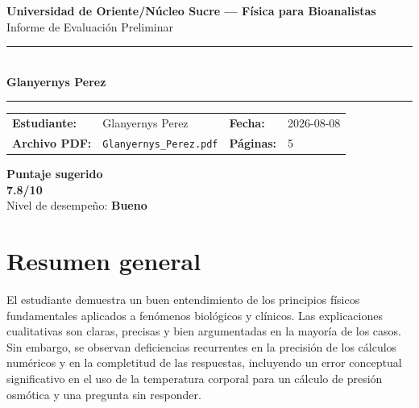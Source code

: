 \documentclass[11pt,a4paper]{article}
\begin{document}
\begin{center}
  {\Large\bfseries\color{azulTitulo} Universidad de Oriente/Núcleo Sucre --- Física para Bioanalistas}\\[4pt]
  {\large Informe de Evaluación Preliminar}\\[12pt]
  \rule{\linewidth}{1.2pt}\\[6pt]
  {\LARGE\bfseries Glanyernys Perez}\\[4pt]
  \rule{\linewidth}{0.6pt}
\end{center}

\vspace{4pt}
\begin{tcolorbox}[cajaTitulo, title=Datos del informe]
\begin{tabular}{@{}llll@{}}
  \textbf{Estudiante:}  & Glanyernys Perez  &
  \textbf{Fecha:}       & 2026-08-08 \\[4pt]
  \textbf{Archivo PDF:} & \texttt{Glanyernys\_Perez.pdf}  &
  \textbf{Páginas:}     & 5 \\
\end{tabular}
\end{tcolorbox}

\vspace{6pt}
\begin{center}
  \begin{tcolorbox}[
    enhanced,
    colback=white, colframe=desempeno_bueno,
    width=0.62\linewidth,
    boxrule=2pt,
    halign=center, valign=center,
    top=8pt, bottom=8pt,
  ]
    \centering
    {\large\bfseries Puntaje sugerido}\\[6pt]
    {\Huge\bfseries\color{desempeno_bueno} 7.8/10}\\[6pt]
    {\large Nivel de desempeño: \textbf{\color{desempeno_bueno} Bueno}}
  \end{tcolorbox}
\end{center}

\section*{Resumen general}
El estudiante demuestra un buen entendimiento de los principios físicos fundamentales aplicados a fenómenos biológicos y clínicos. Las explicaciones cualitativas son claras, precisas y bien argumentadas en la mayoría de los casos. Sin embargo, se observan deficiencias recurrentes en la precisión de los cálculos numéricos y en la completitud de las respuestas, incluyendo un error conceptual significativo en el uso de la temperatura corporal para un cálculo de presión osmótica y una pregunta sin responder.
\end{document}

